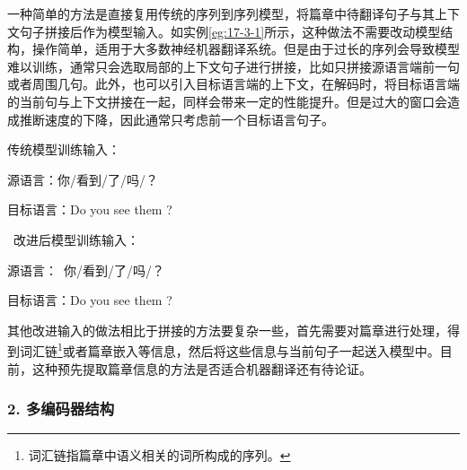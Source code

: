 \parinterval 一种简单的方法是直接复用传统的序列到序列模型，将篇章中待翻译句子与其上下文句子拼接后作为模型输入。如实例\ref{eg:17-3-1}所示，这种做法不需要改动模型结构，操作简单，适用于大多数神经机器翻译系统。但是由于过长的序列会导致模型难以训练，通常只会选取局部的上下文句子进行拼接，比如只拼接源语言端前一句或者周围几句。此外，也可以引入目标语言端的上下文，在解码时，将目标语言端的当前句与上下文拼接在一起，同样会带来一定的性能提升。但是过大的窗口会造成推断速度的下降，因此通常只考虑前一个目标语言句子。

\begin{example}
传统模型训练输入：

\hspace{10em}源语言：你/看到/了/吗/？

\hspace{10em}目标语言：Do you see them ?

\vspace{0.5em}
\qquad\ 改进后模型训练输入：

\hspace{10em}源语言：{}\ 你/看到/了/吗/？

\hspace{10em}目标语言：Do you see them ?

\label{eg:17-3-1}
\end{example}

\parinterval 其他改进输入的做法相比于拼接的方法要复杂一些，首先需要对篇章进行处理，得到词汇链\footnote{词汇链指篇章中语义相关的词所构成的序列。}或者篇章嵌入等信息，然后将这些信息与当前句子一起送入模型中。目前，这种预先提取篇章信息的方法是否适合机器翻译还有待论证。


\subsubsection{2. 多编码器结构}


